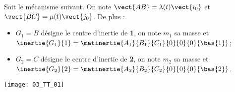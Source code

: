 \normaltrue
\correctionfalse



\setcounter{question}{0}%
\ifcorrection
\else
{}
\fi

\ifprof
\else
Soit le mécanisme suivant. On note $\vect{AB}=\lambda(t)\vect{i_0}$ et $\vect{BC}=\mu(t)\vect{j_0}$. De plus :
\begin{itemize}
\item $G_1 = B$ désigne le centre d'inertie de \textbf{1}, on note $m_1$ sa masse et $\inertie{G_1}{1}=\matinertie{A_1}{B_1}{C_1}{0}{0}{0}{\bas{1}}$; 
\item $G_2 = C$ désigne le centre d'inertie de \textbf{2}, on note $m_2$ sa masse et $\inertie{G_2}{2}=\matinertie{A_2}{B_2}{C_2}{0}{0}{0}{\bas{2}}$.
\end{itemize}
\begin{marginfigure}
\texttt{[image: 03\_TT\_01]}
\end{marginfigure}
\fi

\ifprof
\else
\fi

\ifprof
\else
\fi

\ifprof
\else
\fi

\ifprof
\else
{}
\fi